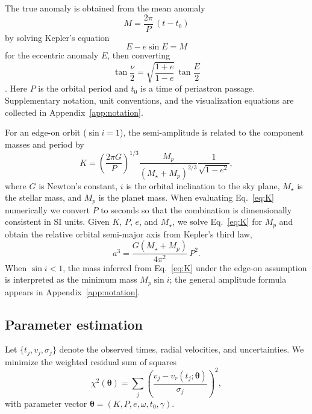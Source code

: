 \documentclass[11pt]{article}
\begin{document}
The true anomaly is obtained from the mean anomaly
\begin{equation}
M = \frac{2\pi}{P}\,(t - t_0)
\end{equation}
by solving Kepler's equation
\begin{equation}
E - e\sin E = M
\end{equation}
for the eccentric anomaly $E$, then converting
\begin{equation}
\tan\frac{\nu}{2}
=
\sqrt{\frac{1+e}{1-e}}\,
\tan\frac{E}{2}
\end{equation}
\citep{murray1999solar}.
Here $P$ is the orbital period and $t_0$ is a time of periastron passage.
Supplementary notation, unit conventions, and the visualization equations are
collected in Appendix~\ref{app:notation}.

For an edge-on orbit ($\sin i = 1$), the semi-amplitude is related to the
component masses and period by
\begin{equation}
K
=
\left(\frac{2\pi G}{P}\right)^{1/3}
\frac{M_p}{(M_\star + M_p)^{2/3}}
\frac{1}{\sqrt{1-e^2}},
\label{eq:K}
\end{equation}
where $G$ is Newton's constant, $i$ is the orbital inclination to the sky
plane, $M_\star$ is the stellar mass, and $M_p$ is the planet mass.
When evaluating Eq.~\eqref{eq:K} numerically we convert $P$ to seconds so that
the combination is dimensionally consistent in SI units. Given $K$, $P$, $e$,
and $M_\star$, we solve Eq.~\eqref{eq:K} for $M_p$ and obtain the relative
orbital semi-major axis from Kepler's third law,
\begin{equation}
a^3 = \frac{G(M_\star + M_p)}{4\pi^2}\,P^2.
\end{equation}
When $\sin i < 1$, the mass inferred from Eq.~\eqref{eq:K} under the edge-on
assumption is interpreted as the minimum mass $M_p\sin i$; the general
amplitude formula appears in Appendix~\ref{app:notation}.

\subsection{Parameter estimation}

Let $\{t_j, v_j, \sigma_j\}$ denote the observed times, radial velocities, and
uncertainties. We minimize the weighted residual sum of squares
\begin{equation}
\chi^2(\boldsymbol{\theta})
=
\sum_j
\left(
\frac{v_j - v_r(t_j;\boldsymbol{\theta})}{\sigma_j}
\right)^2,
\end{equation}
with parameter vector
$\boldsymbol{\theta} = (K, P, e, \omega, t_0, \gamma)$.
\end{document}
